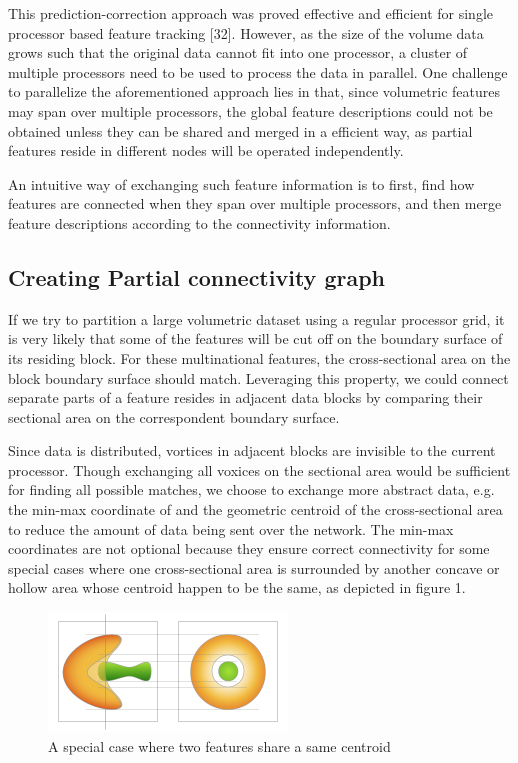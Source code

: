 \documentclass[10pt, conference, compsocconf]{IEEEtran}
\begin{document}
This prediction-correction approach was proved effective and efficient for single processor based feature tracking [32]. However, as the size of the volume data grows such that the original data cannot fit into one processor, a cluster of multiple processors need to be used to process the data in parallel. One challenge to parallelize the aforementioned approach lies in that, since volumetric features may span over multiple processors, the global feature descriptions could not be obtained unless they can be shared and merged in a efficient way, as partial features reside in different nodes will be operated independently. 

An intuitive way of exchanging such feature information is to first, find how features are connected when they span over multiple processors, and then merge feature descriptions according to the connectivity information.

\subsection{Creating Partial connectivity graph}
If we try to partition a large volumetric dataset using a regular processor grid, it is very likely that some of the features will be cut off on the boundary surface of its residing block. For these multinational features, the cross-sectional area on the block boundary surface should match. Leveraging this property, we could connect separate parts of a feature resides in adjacent data blocks by comparing their sectional area on the correspondent boundary surface. 

Since data is distributed, vortices in adjacent blocks are invisible to the current processor. Though exchanging all voxices on the sectional area would be sufficient for finding all possible matches, we choose to exchange more abstract data, e.g. the min-max coordinate of and the geometric centroid of the cross-sectional area to reduce the amount of data being sent over the network. The min-max coordinates are not optional because they ensure correct connectivity for some special cases where one cross-sectional area is surrounded by another concave or hollow area whose centroid happen to be the same, as depicted in figure 1.

\begin{figure}[htpb]
\centering
\includegraphics[width=2.5in]{figure1.png}
\caption{A special case where two features share a same centroid}
\label{fig_sim}
\end{figure}
\end{document}
